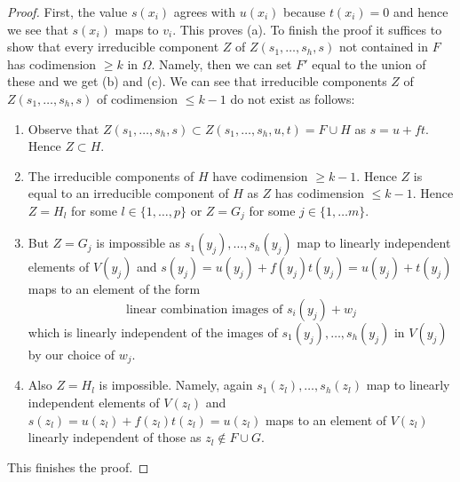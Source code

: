 \documentclass{amsart}
\theoremstyle{plain}
\theoremstyle{definition}
\theoremstyle{remark}
\numberwithin{equation}{subsection}
\begin{document}
\begin{proof}
\medskip\noindent
First, the value $s(x_i)$ agrees with $u(x_i)$ because
$t(x_i) = 0$ and hence we see that $s(x_i)$ maps to $v_i$.
This proves (a).
To finish the proof it suffices to show that every irreducible
component $Z$ of $Z(s_1, \ldots, s_h, s)$ not contained in $F$
has codimension $\geq k$ in $\Omega$. Namely, then we can set $F'$
equal to the union of these and we get (b) and (c).
We can see that irreducible components $Z$ of $Z(s_1, \ldots, s_h, s)$
of codimension $\leq k - 1$ do not exist as follows:
\begin{enumerate}
\item Observe that
$Z(s_1, \ldots, s_h, s) \subset Z(s_1, \ldots, s_h, u, t) = F \cup H$
as $s = u + ft$. Hence $Z \subset H$.
\item The irreducible components of $H$ have codimension $\geq k - 1$.
Hence $Z$ is equal to an irreducible component of $H$
as $Z$ has codimension $\leq k - 1$.
Hence $Z = H_l$ for some $l \in \{1, \ldots, p\}$ or
$Z = G_j$ for some $j \in \{1, \ldots m\}$.
\item But $Z = G_j$ is impossible as $s_1(y_j), \ldots, s_h(y_j)$
map to linearly independent elements of $V(y_j)$ and
$s(y_j) = u(y_j) + f(y_j) t(y_j) = u(y_j) + t(y_j)$
maps to an element of the form
$$
\text{linear combination images of }s_i(y_j) + w_j
$$
which is linearly independent of the images of $s_1(y_j), \ldots, s_h(y_j)$
in $V(y_j)$ by our choice of $w_j$.
\item Also $Z = H_l$ is impossible. Namely, again
$s_1(z_l), \ldots, s_h(z_l)$ map to linearly independent
elements of $V(z_l)$ and $s(z_l) = u(z_l) + f(z_l) t(z_l) = u(z_l)$
maps to an element of $V(z_l)$ linearly independent of those
as $z_l \not \in F \cup G$.
\end{enumerate}
This finishes the proof.
\end{proof}
\end{document}
